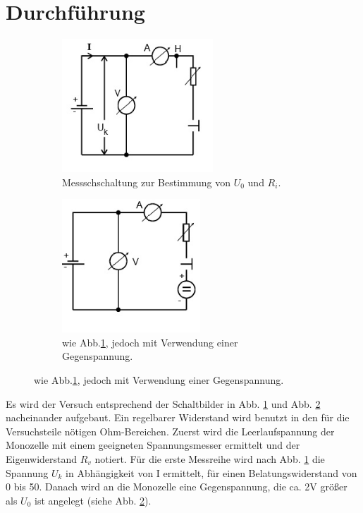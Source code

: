 \section{Durchführung}
\label{sec:Durchführung}
\begin{figure}
  \centering
  \begin{subfigure}{0.48\textwidth}
    \centering
    \includegraphics[height=5cm]{data/abb2.jpg}
    \caption{Messschschaltung zur Bestimmung von $U_0$ und $R_i$. \cite{V301}}
    \label{fig:abb2}
  \end{subfigure}
  \begin{subfigure}{0.48\textwidth}
    \centering
    \includegraphics[height=5cm]{data/abb3.jpg}
    \caption{wie Abb.\ref{fig:abb2}, jedoch mit Verwendung einer Gegenspannung. \cite{V301}}
    \label{fig:abb3}
  \end{subfigure}
  \label{fig:Phasen}
\end{figure}
\noindent
Es wird der Versuch entsprechend der Schaltbilder in Abb. \ref{fig:abb2} und Abb. \ref{fig:abb3} nacheinander aufgebaut.
Ein regelbarer Widerstand wird benutzt in den für die Versuchsteile nötigen Ohm-Bereichen.
Zuerst wird die Leerlaufspannung der Monozelle mit einem geeigneten Spannungsmesser ermittelt und der Eigenwiderstand $R_v$ notiert.
Für die erste Messreihe wird nach Abb. \ref{fig:abb2} die Spannung $U_k$ in Abhängigkeit von I ermittelt, für einen Belatungswiderstand von 0 bis \SI{50}{\omega}.
Danach wird an die Monozelle eine Gegenspannung, die ca. 2V größer als $U_0$ ist angelegt (siehe Abb. \ref{fig:abb3}).
